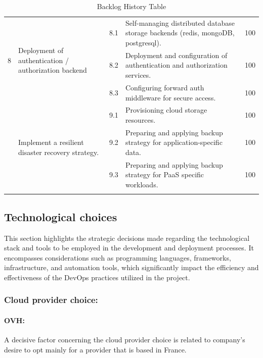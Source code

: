 \begin{longtable}[H]{|m{1cm}|m{3.25cm}|m{1cm}|m{7cm}|m{1.2cm}|}
\multirow{3}{1cm}{8} & \multirow{3}{3.25cm}{\raggedright Deployment of authentication / authorization backend} 	& 8.1 & \raggedright Self-managing distributed database storage backends (redis, mongoDB, postgresql).	 & 100\\
\cline{3-5}
&   & 8.2 &	\raggedright Deployment and configuration of authentication and authorization services.	 & 100\\
\cline{3-5}
&   & 8.3 &	\raggedright Configuring forward auth middleware for secure access.	 & 100\\
   \hline
   \pagebreak
   \hline
\multirow{3}{1cm}{9} & \multirow{3}{3.25cm}{\raggedright Implement a resilient disaster recovery strategy.} & 9.1 &\raggedright  Provisioning cloud storage resources.		 & 100\\
\cline{3-5}
&   & 9.2 & \raggedright Preparing and applying backup strategy for application-specific data.	 & 100\\
\cline{3-5}
&   & 9.3 &	\raggedright Preparing and applying backup strategy for PaaS specific workloads.	 & 100\\
 \hline
\caption{ Backlog History Table }
\end{longtable}

\subsection{Technological choices }
\hspace{7mm}This section highlights the strategic decisions made regarding the technological stack and tools to be employed in the development and deployment processes. It encompasses considerations such as programming languages, frameworks, infrastructure, and automation tools, which significantly impact the efficiency and effectiveness of the DevOps practices utilized in the project.
\subsubsection{Cloud provider choice: } 

\paragraph{OVH\cite{OVHcloud}: }

A decisive factor concerning the cloud provider choice is related to company’s desire to opt mainly for a provider that is based in France.  

